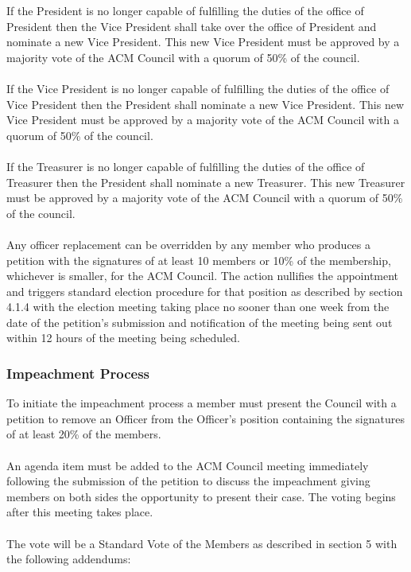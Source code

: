 \documentclass[12pt,titlepage]{article}
\begin{document}
If the President is no longer capable of fulfilling the duties of the office of President then the Vice President shall take over the office of President and nominate a new Vice President. This new Vice President must be approved by a majority vote of the ACM Council with a quorum of 50\% of the council.\\
\\
If the Vice President is no longer capable of fulfilling the duties of the office of Vice President then the President shall nominate a new Vice President. This new Vice President must be approved by a majority vote of the ACM Council with a quorum of 50\% of the council.\\
\\
If the Treasurer is no longer capable of fulfilling the duties of the office of Treasurer then the President shall nominate a new Treasurer. This new Treasurer must be approved by a majority vote of the ACM Council with a quorum of 50\% of the council.\\
\\
Any officer replacement can be overridden by any member who produces a petition with the signatures of at least 10 members or 10\% of the membership, whichever is smaller, for the ACM Council. The action nullifies the appointment and triggers standard election procedure for that position as described by section 4.1.4 with the election meeting taking place no sooner than one week from the date of the petition's submission and notification of the meeting being sent out within 12 hours of the meeting being scheduled.

\subsubsection{Impeachment Process}

To initiate the impeachment process a member must present the Council with a petition to remove an Officer from the Officer's position containing the signatures of at least 20\% of the members.\\
\\
An agenda item must be added to the ACM Council meeting immediately following the submission of the petition to discuss the impeachment giving members on both sides the opportunity to present their case. The voting begins after this meeting takes place.\\
\\
The vote will be a Standard Vote of the Members as described in section 5 with the following addendums:
\end{document}
